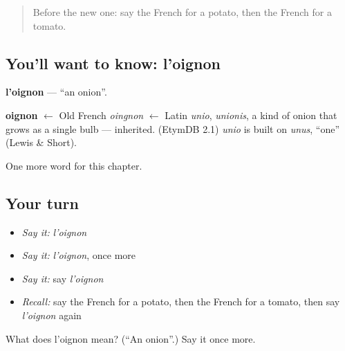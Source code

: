 \label{lesson:FR-C68-oignon}



\begin{quote}
Before the new one: say the French for a potato, then the French for a tomato.
\end{quote}

\subsection*{You'll want to know: l'oignon}
\textbf{l'oignon} — \textquotedblleft{}an onion\textquotedblright{}.

\begin{cousinweb}
\textbf{oignon} $\leftarrow$ Old French \emph{oingnon} $\leftarrow$ Latin \emph{unio}, \emph{unionis}, a kind of onion that grows as a single bulb — inherited. (EtymDB 2.1) \emph{unio} is built on \emph{unus}, \textquotedblleft{}one\textquotedblright{} (Lewis \& Short).
\end{cousinweb}

\begin{grammarlens}[title={What you've built}]
One more word for this chapter.
\end{grammarlens}

\subsection*{Your turn}
\begin{itemize}
\raggedright
  \item \emph{Say it:} \emph{l'oignon}
  \item \emph{Say it:} \emph{l'oignon}, once more
  \item \emph{Say it:} say \emph{l'oignon}
  \item \emph{Recall:} say the French for a potato, then the French for a tomato, then say \emph{l'oignon} again
\end{itemize}

\begin{tcolorbox}[breakable,colback=teal!4,colframe=teal!35!black,title={Before you move on}]
What does l'oignon mean? (\textquotedblleft{}An onion\textquotedblright{}.) Say it once more.
\end{tcolorbox}
